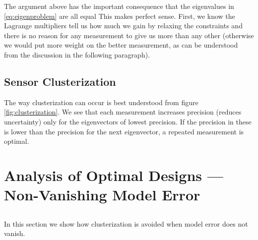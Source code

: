 \documentclass{amsart}
\numberwithin{equation}{section}
\begin{document}
The argument above has the important consequence that the eigenvalues
in \eqref{eq:eigenproblem} are all equal This makes perfect
sense. First, we know the Lagrange multipliers tell us how much we
gain by relaxing the constraints and there is no reason for any
measurement to give us more than any other (otherwise we would put
more weight on the better measurement, as can be understood from the
discussion in the following paragraph).%

\subsection{Sensor Clusterization}\label{subsec:clusterization}
The way clusterization can occur is best understood from figure
\ref{fig:clusterization}. We see that each measurement increases
precision (reduces uncertainty) only for the eigenvectors of lowest
precision. If the precision in these is lower than the precision for
the next eigenvector, a repeated measurement is optimal.













\section{Analysis of Optimal Designs --- Non-Vanishing Model Error}
\subsection{}
In this section we show how clusterization is avoided when model
error does not vanish.
\end{document}
